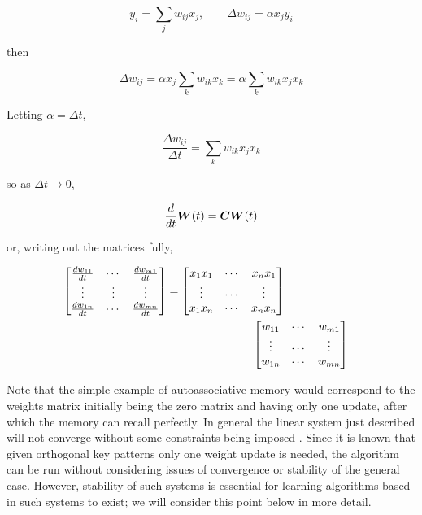 \begin{equation*}
  y_i = \sum_{j} w_{ij} x_j, \qquad \Delta w_{ij} = \alpha x_j y_i
\end{equation*}

then

\begin{equation*}
\Delta w_{ij} = \alpha x_j \sum_k w_{ik} x_k = \alpha \sum_k w_{ik}x_j x_k
\end{equation*}

Letting $\alpha = \Delta t$,

\begin{equation*}
  \frac{\Delta w_{ij}}{\Delta t} = \sum_k w_{ik}x_j x_k
\end{equation*}

so as $\Delta t \rightarrow 0$,

\begin{equation*}
\frac{d}{dt}\boldsymbol{W}(t) = \boldsymbol{C}\boldsymbol{W}(t)
\end{equation*}

or, writing out the matrices fully,

\begin{equation*}
  \begin{split}
  \begin{bmatrix}
    \frac{dw_{11}}{dt} & \cdots & \frac{dw_{m1}}{dt} \\
    \vdots & \vdots & \vdots \\
    \frac{dw_{1n}}{dt} & \cdots & \frac{dw_{mn}}{dt} \\    
  \end{bmatrix} = \begin{bmatrix}
    x_1 x_1 & \cdots & x_n x_1 \\
    \vdots & \cdots & \vdots \\
    x_1 x_n & \cdots & x_n x_n 
  \end{bmatrix} \\
  & \hspace{-1.0cm}\begin{bmatrix}
    w_{11} & \cdots & w_{m1} \\
    \vdots & \cdots & \vdots \\
    w_{1n} & \cdots & w_{mn}
    \end{bmatrix}
  \end{split}
\end{equation*}

Note that the simple example of autoassociative memory would correspond to the weights matrix initially being the zero matrix and having only one update, after which the memory can recall perfectly. In general the linear system just described will not converge without some constraints being imposed \cite[p. 40]{fyfe2000}. Since it is known that given orthogonal key patterns only one weight update is needed, the algorithm can be run without considering issues of convergence or stability of the general case. However, stability of such systems is essential for learning algorithms based in such systems to exist; we will consider this point below in more detail.

